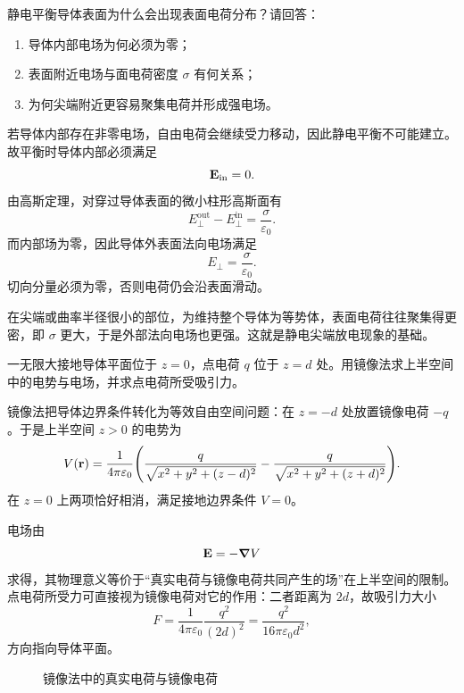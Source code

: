 \begin{university}
静电平衡导体表面为什么会出现表面电荷分布？请回答：
\begin{enumerate}
  \item 导体内部电场为何必须为零；
  \item 表面附近电场与面电荷密度 $\sigma$ 有何关系；
  \item 为何尖端附近更容易聚集电荷并形成强电场。
\end{enumerate}
\begin{solution}
若导体内部存在非零电场，自由电荷会继续受力移动，因此静电平衡不可能建立。故平衡时导体内部必须满足
\[
\vb{E}_{\text{in}}=0.
\]
由高斯定理，对穿过导体表面的微小柱形高斯面有
\[
E_\perp^{\text{out}}-E_\perp^{\text{in}}=\frac{\sigma}{\varepsilon_0}.
\]
而内部场为零，因此导体外表面法向电场满足
\[
E_\perp=\frac{\sigma}{\varepsilon_0}.
\]
切向分量必须为零，否则电荷仍会沿表面滑动。

在尖端或曲率半径很小的部位，为维持整个导体为等势体，表面电荷往往聚集得更密，即 $\sigma$ 更大，于是外部法向电场也更强。这就是静电尖端放电现象的基础。
\end{solution}
\end{university}

\begin{university}
一无限大接地导体平面位于 $z=0$，点电荷 $q$ 位于 $z=d$ 处。用镜像法求上半空间中的电势与电场，并求点电荷所受吸引力。
\begin{solution}
镜像法把导体边界条件转化为等效自由空间问题：在 $z=-d$ 处放置镜像电荷 $-q$。于是上半空间 $z>0$ 的电势为
\[
V(\vb{r})=\frac{1}{4\pi\varepsilon_0}\qty(\frac{q}{\sqrt{x^2+y^2+(z-d)^2}}-\frac{q}{\sqrt{x^2+y^2+(z+d)^2}}).
\]
在 $z=0$ 上两项恰好相消，满足接地边界条件 $V=0$。

电场由
\[
\vb{E}=-\grad V
\]
求得，其物理意义等价于“真实电荷与镜像电荷共同产生的场”在上半空间的限制。点电荷所受力可直接视为镜像电荷对它的作用：二者距离为 $2d$，故吸引力大小
\[
F=\frac{1}{4\pi\varepsilon_0}\frac{q^2}{(2d)^2}=\frac{q^2}{16\pi\varepsilon_0 d^2},
\]
方向指向导体平面。

\begin{figure}[H]
\centering
{}
\caption{镜像法中的真实电荷与镜像电荷}
\end{figure}
\end{solution}
\end{university}

